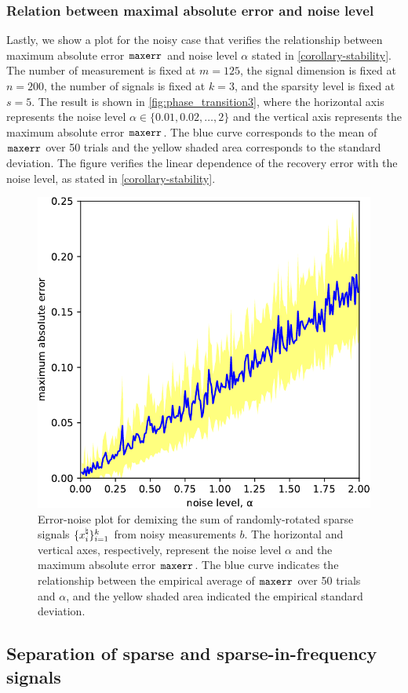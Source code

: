 \subsubsection{Relation between maximal absolute error and noise level}
Lastly, we show a plot for the noisy case that verifies the relationship between maximum absolute error $\mathop{\tt maxerr}$ and noise level $\alpha$ stated in \autoref{corollary-stability}. The number of measurement is fixed at $m=125$, the signal dimension is fixed at $n=200$, the number of signals is fixed at $k=3$, and the sparsity level is fixed at $s=5$. The result is shown in \autoref{fig:phase_transition3}, where the horizontal axis represents the noise level $\alpha\in\{0.01, 0.02, \dots, 2\}$ and the vertical axis represents the maximum absolute error $\mathop{\tt maxerr}$. The blue curve corresponds to the mean of $\mathop{\tt maxerr}$ over 50 trials and the yellow shaded area corresponds to the standard deviation. The figure verifies the linear dependence of the recovery error with the noise level, as stated in \autoref{corollary-stability}.

\begin{figure}[t]
    \centering\small
    \includegraphics[width=.5\linewidth]{./figures/relation_e_noise.pdf}
    \caption{Error-noise plot for demixing the sum of randomly-rotated sparse signals $\{x_i^{\natural}\}_{i=1}^k$ from noisy measurements $b$. The horizontal and vertical axes, respectively, represent the noise level $\alpha$ and the maximum absolute error $\mathop{\tt maxerr}$. The blue curve indicates the relationship between the empirical average of $\mathop{\tt maxerr}$ over 50 trials and $\alpha$, and the yellow shaded area indicated the empirical standard deviation. }
    \label{fig:phase_transition3}
\end{figure}


\subsection{Separation of sparse and sparse-in-frequency signals} \label{sec:3-5-2}

